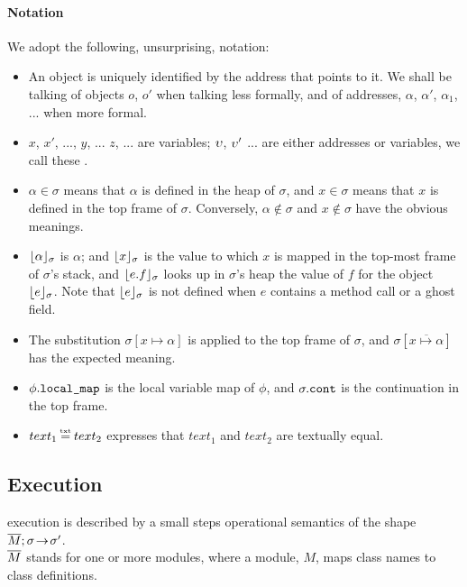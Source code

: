 \paragraph{Notation} We adopt the following, unsurprising, notation:
\begin{itemize}
\item
{An object is uniquely identified by the address that points to it. We shall be talking of objects $o$, $o'$ when talking less formally, and of addresses, $\alpha$, $\alpha'$, $\alpha_1$, ...  when more formal.}
\item
$x$, $x'$,  ..., $y$, ... $z$, ... are variables;  $\upsilon$, $\upsilon'$ ... are either addresses or variables, we call these \emph{\atoms}.
\item
$\alpha \in \sigma$ means that $\alpha$ is defined in the heap of $\sigma$, and $x\in \sigma$ means that $x$ is defined in the top frame of $\sigma$.
Conversely,  $\alpha\notin\sigma$ and $x\notin\sigma$ %
 have the obvious meanings.
\item
$\lfloor \alpha \rfloor_{\sigma}$  is $\alpha$; and $\lfloor x \rfloor_{\sigma}$  is the value to which  $x$  is mapped in the top-most frame of $\sigma$'s stack, 
and $\lfloor e.f \rfloor_{\sigma}$ looks up in $\sigma$'s heap the value of $f$ for the object  $\lfloor e \rfloor_{\sigma}$.
Note that $\lfloor e \rfloor_{\sigma}$ is not defined when $e$ contains a method call or a ghost field.
\item The substitution  $\sigma[x \mapsto \alpha]$ is applied to the top frame of $\sigma$, and $\sigma[\overline{x \mapsto \alpha}]$ %
has the expected meaning.
\item
{$\phi.\mbox{\normalfont{\texttt{local\_map}}}$ is the local variable map of $\phi$}, and $\sigma.\mbox{\normalfont{\texttt{cont}}}$ is the continuation in the top frame.
\item
$text_1 \txteq text_2$ expresses that $text_1$ and $text_2$ are textually equal.
\end{itemize}

  

  
\subsection{\LangOO Execution}
\label{sect:execution}

 \LangOO execution is described by a small steps operational semantics of the shape $\overline{M};\sigma\! \rightarrow\! {\sigma'}$.\\
  $\overline{M}$ stands for one or more modules, where a
  module,  $M$, maps class names to class definitions. 
   
